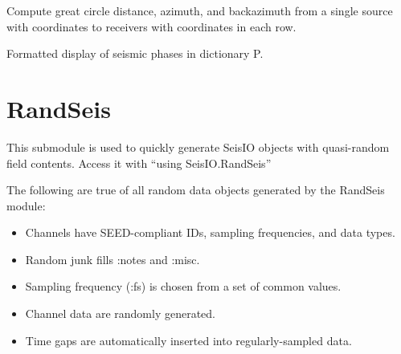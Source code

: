 \documentclass[letterpaper,11pt,english]{sphinxmanual}
\begin{document}
Compute great circle distance, azimuth, and backazimuth from a single source
with coordinates  to receivers  with coordinates
 in each row.

\begin{fulllineitems}
\label{\detokenize{src/Submodules/quake:show_phases}}
\end{fulllineitems}


Formatted display of seismic phases in dictionary P.


\section{RandSeis}
\label{\detokenize{src/Submodules/randseis:randseis}}\label{\detokenize{src/Submodules/randseis::doc}}
This submodule is used to quickly generate SeisIO objects with quasi-random
field contents. Access it with “using SeisIO.RandSeis”

The following are true of all random data objects generated by the RandSeis
module:
\begin{itemize}
\item {} 
Channels have SEED-compliant IDs, sampling frequencies, and data types.

\item {} 
Random junk fills :notes and :misc.

\item {} 
Sampling frequency (:fs) is chosen from a set of common values.

\item {} 
Channel data are randomly generated.

\item {} 
Time gaps are automatically inserted into regularly-sampled data.

\end{itemize}

\begin{fulllineitems}
\label{\detokenize{src/Submodules/randseis:randPhaseCat}}
\end{fulllineitems}
\end{document}
